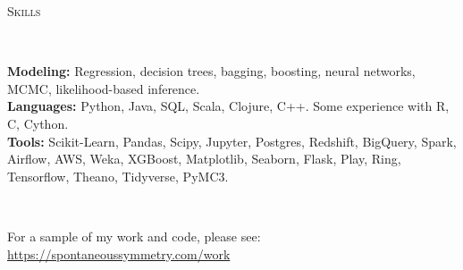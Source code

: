 \documentclass[9pt]{article}
\newenvironment{changemargin}[2]{%
  \begin{list}{}{%
    \setlength{\topsep}{0pt}%
    \setlength{\leftmargin}{#1}%
    \setlength{\rightmargin}{#2}%
    \setlength{\listparindent}{\parindent}%
    \setlength{\itemindent}{\parindent}%
    \setlength{\parsep}{\parskip}%
  }%
  \item[]}{\end{list}
}
\newcommand{\lineover}{
  \begin{changemargin}{-0.05in}{-0.05in}
    \vspace*{-8pt}
    \hrulefill \\
    \vspace*{-2pt}
  \end{changemargin}
}
\newcommand{\header}[1]{
  \begin{changemargin}{-0.5in}{-0.5in}
    \scshape{#1}
    \lineover
  \end{changemargin}
}
\newenvironment{body} {
  \vspace*{-16pt}
\begin{changemargin}{-0.25in}{-0.5in}
  }
{\end{changemargin}
}
\begin{document}
\header{Skills}
\begin{body}
  \vspace{14pt}
  \textbf{Modeling:}{} Regression, decision trees, bagging, boosting, neural networks, MCMC, likelihood-based inference. \\
  \textbf{Languages:}{} Python, Java, SQL, Scala, Clojure, C++.  Some experience with R, C, Cython. \\
  \textbf{Tools:}{} Scikit-Learn, Pandas, Scipy, Jupyter, Postgres, Redshift, BigQuery, Spark, Airflow, AWS, Weka, XGBoost, Matplotlib, Seaborn, Flask, Play, Ring,  Tensorflow, Theano, Tidyverse, PyMC3.  \\
\end{body}

\smallskip




\header{}
\begin{body}
  \vspace{14pt}
  For a sample of my work and code, please see: {\url{https://spontaneoussymmetry.com/work}}
\end{body}
\end{document}

